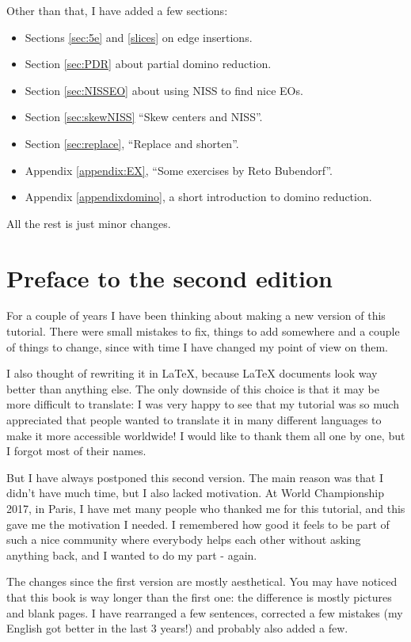 \documentclass[11pt,a4paper]{book}
\begin{document}
Other than that, I have added a few sections:
\begin{itemize}
\item Sections \ref{sec:5e} and \ref{slices} on edge insertions.
\item Section \ref{sec:PDR} about partial domino reduction.
\item Section \ref{sec:NISSEO} about using NISS to find nice EOs.
\item Section \ref{sec:skewNISS} ``Skew centers and NISS''.
\item Section \ref{sec:replace}, ``Replace and shorten''.
\item Appendix \ref{appendix:EX}, ``Some exercises by Reto Bubendorf''.
\item Appendix \ref{appendixdomino}, a short introduction to domino reduction.
\end{itemize}

All the rest is just minor changes.

\newpage



\section*{Preface to the second edition}

For a couple of years I have been thinking about making a new version of this tutorial. There were small mistakes to fix, things to add somewhere and a couple of things to change, since with time I have changed my point of view on them.

I also thought of rewriting it in LaTeX, because LaTeX documents look way better than anything else. The only downside of this choice is that it may be more difficult to translate: I was very happy to see that my tutorial was so much appreciated that people wanted to translate it in many different languages to make it more accessible worldwide! I would like to thank them all one by one, but I forgot most of their names.

But I have always postponed this second version. The main reason was that I didn't have much time, but I also lacked motivation. At World Championship 2017, in Paris, I have met many people who thanked me for this tutorial, and this gave me the motivation I needed. I remembered how good it feels to be part of such a nice community where everybody helps each other without asking anything back, and I wanted to do my part - again.

\bigskip
The changes since the first version are mostly aesthetical. You may have noticed that this book is way longer than the first one: the difference is mostly pictures and blank pages. I have rearranged a few sentences, corrected a few mistakes (my English got better in the last 3 years!) and probably also added a few.
\end{document}
